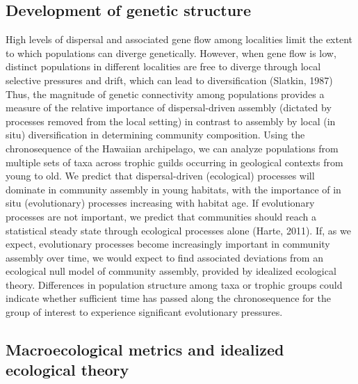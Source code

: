 \subsection{Development of genetic structure}

High levels of dispersal and associated gene flow among localities
limit the extent to which populations can diverge
genetically. However, when gene flow is low, distinct populations in
different localities are free to diverge through local selective
pressures and drift, which can lead to diversification (Slatkin, 1987)
Thus, the magnitude of genetic connectivity among populations provides
a measure of the relative importance of dispersal-driven assembly
(dictated by processes removed from the local setting) in contrast to
assembly by local (in situ) diversification in determining community
composition. Using the chronosequence of the Hawaiian archipelago, we
can analyze populations from multiple sets of taxa across trophic
guilds occurring in geological contexts from young to old. We predict
that dispersal-driven (ecological) processes will dominate in
community assembly in young habitats, with the importance of in situ
(evolutionary) processes increasing with habitat age. If evolutionary
processes are not important, we predict that communities should reach
a statistical steady state through ecological processes alone (Harte,
2011). If, as we expect, evolutionary processes become increasingly
important in community assembly over time, we would expect to find
associated deviations from an ecological null model of community
assembly, provided by idealized ecological theory. Differences in
population structure among taxa or trophic groups could indicate
whether sufficient time has passed along the chronosequence for the
group of interest to experience significant evolutionary pressures.


\subsection{Macroecological metrics and idealized ecological theory}

